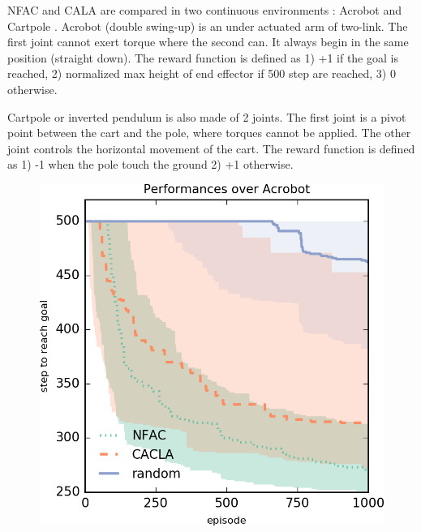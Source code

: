 
NFAC and CALA are compared in two continuous environments : Acrobot \cite{Spong1995} and Cartpole \cite{Riedmiller2007}.
Acrobot (double swing-up) is an under actuated arm of two-link. The first joint
cannot exert torque where the second can.
It always begin in the same position (straight down).
The reward function is defined as 1) +1 if the goal is reached, 2) normalized max 
height of end effector if 500 step are reached, 3) 0 otherwise.

Cartpole or inverted pendulum is also made of 2 joints. The first joint is a pivot point 
between the cart and the pole, where torques cannot be applied. The other joint controls
the horizontal movement of the cart.
The reward function is defined as 1) -1 when the pole touch the ground 2) +1 otherwise.

\begin{figure}[h]
\centering
\begin{minipage}{.5\textwidth}
  \centering
  \includegraphics[width=0.95\linewidth]{result_plotting/adacrobot-1ddl_perf.png}
\end{minipage}%
\begin{minipage}{.5\textwidth}
  \centering

\end{minipage}
\end{figure}
